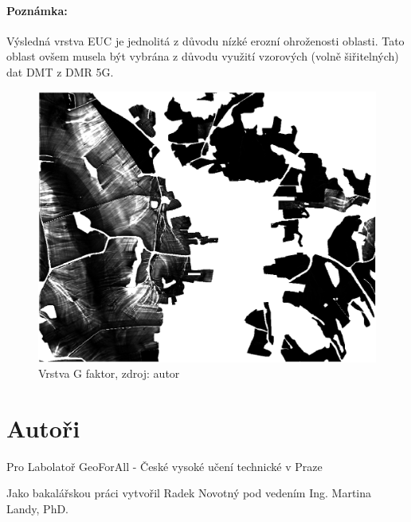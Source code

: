 \paragraph{Poznámka:}
Výsledná vrstva EUC je jednolitá z důvodu nízké erozní ohroženosti oblasti. Tato oblast ovšem musela být vybrána z důvodu využití vzorových (volně šiřitelných) dat DMT z DMR 5G.
\begin{figure}[H] \centering
		\includegraphics[width=.5\textwidth]{./pictures/lokalni_eroze_layer.png}
		\caption[Vrstva G faktor]{Vrstva G faktor, zdroj: autor}
		\label{g_sample}
\end{figure}
\section{Autoři}
Pro Labolatoř GeoForAll - České vysoké učení technické v Praze

Jako bakalářskou práci vytvořil Radek Novotný pod vedením Ing. Martina Landy, PhD.